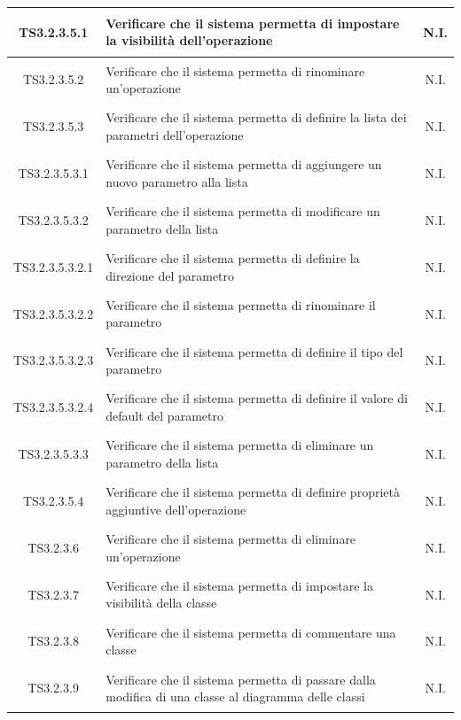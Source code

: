 \documentclass[../PianoDiQualifica.tex]{subfiles}
\begin{document}
\begin{longtable}{|c|>{\centering}p{10cm}|c|}
	\hline
	\hypertarget{TS3.2.3.5.1}{TS3.2.3.5.1} & Verificare che il sistema permetta di impostare la visibilità dell'operazione & N.I. \\
	\hline
	\hypertarget{TS3.2.3.5.2}{TS3.2.3.5.2} & Verificare che il sistema permetta di rinominare un'operazione & N.I. \\
	\hline
	\hypertarget{TS3.2.3.5.3}{TS3.2.3.5.3} & Verificare che il sistema permetta di definire la lista dei parametri dell'operazione & N.I. \\
	\hline
	\hypertarget{TS3.2.3.5.3.1}{TS3.2.3.5.3.1} & Verificare che il sistema permetta di aggiungere un nuovo parametro alla lista & N.I. \\
	\hline
	\hypertarget{TS3.2.3.5.3.2}{TS3.2.3.5.3.2} & Verificare che il sistema permetta di modificare un parametro della lista & N.I. \\
	\hline
	\hypertarget{TS3.2.3.5.3.2.1}{TS3.2.3.5.3.2.1} & Verificare che il sistema permetta di definire la direzione del parametro & N.I. \\
	\hline
	\hypertarget{TS3.2.3.5.3.2.2}{TS3.2.3.5.3.2.2} & Verificare che il sistema permetta di rinominare il parametro & N.I. \\
	\hline
	\hypertarget{TS3.2.3.5.3.2.3}{TS3.2.3.5.3.2.3} & Verificare che il sistema permetta di definire il tipo del parametro & N.I. \\
	\hline
	\hypertarget{TS3.2.3.5.3.2.4}{TS3.2.3.5.3.2.4} & Verificare che il sistema permetta di definire il valore di default del parametro & N.I. \\
	\hline
	\hypertarget{TS3.2.3.5.3.3}{TS3.2.3.5.3.3} & Verificare che il sistema permetta di eliminare un parametro della lista & N.I. \\
	\hline
	\hypertarget{TS3.2.3.5.4}{TS3.2.3.5.4} & Verificare che il sistema permetta di definire proprietà aggiuntive dell'operazione & N.I. \\
	\hline
	\hypertarget{TS3.2.3.6}{TS3.2.3.6} & Verificare che il sistema permetta di eliminare un'operazione & N.I. \\
	\hline
	\hypertarget{TS3.2.3.7}{TS3.2.3.7} & Verificare che il sistema permetta di impostare la visibilità della classe & N.I. \\
	\hline
	\hypertarget{TS3.2.3.8}{TS3.2.3.8} & Verificare che il sistema permetta di commentare una classe & N.I. \\
	\hline
	\hypertarget{TS3.2.3.9}{TS3.2.3.9} & Verificare che il sistema permetta di passare dalla modifica di una classe al diagramma delle classi & N.I. \\

\end{longtable}
\end{document}

